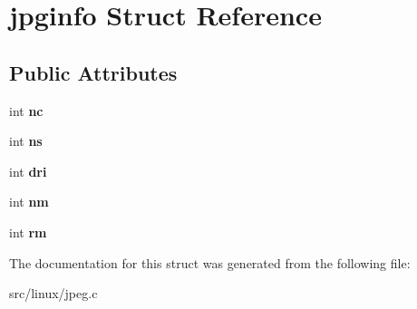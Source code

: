 \hypertarget{structjpginfo}{\section{jpginfo \-Struct \-Reference}
\label{structjpginfo}
}
\subsection*{\-Public \-Attributes}
\begin{DoxyCompactItemize}
\item 
\hypertarget{structjpginfo_a591a92da5251b01e7d4a77b7cf8de9a4}{int {\bfseries nc}}\label{structjpginfo_a591a92da5251b01e7d4a77b7cf8de9a4}

\item 
\hypertarget{structjpginfo_abd9691c1d18a5c9dbf731ba17b0ef345}{int {\bfseries ns}}\label{structjpginfo_abd9691c1d18a5c9dbf731ba17b0ef345}

\item 
\hypertarget{structjpginfo_aa91f749c3118de0e080c7f1bcd9322c4}{int {\bfseries dri}}\label{structjpginfo_aa91f749c3118de0e080c7f1bcd9322c4}

\item 
\hypertarget{structjpginfo_a6686c5a530ab2888cf5987cbefb0123a}{int {\bfseries nm}}\label{structjpginfo_a6686c5a530ab2888cf5987cbefb0123a}

\item 
\hypertarget{structjpginfo_a4b5fae8fa04eacd730eb6ebec7670ec8}{int {\bfseries rm}}\label{structjpginfo_a4b5fae8fa04eacd730eb6ebec7670ec8}

\end{DoxyCompactItemize}


\-The documentation for this struct was generated from the following file\-:\begin{DoxyCompactItemize}
\item 
src/linux/jpeg.\-c\end{DoxyCompactItemize}
